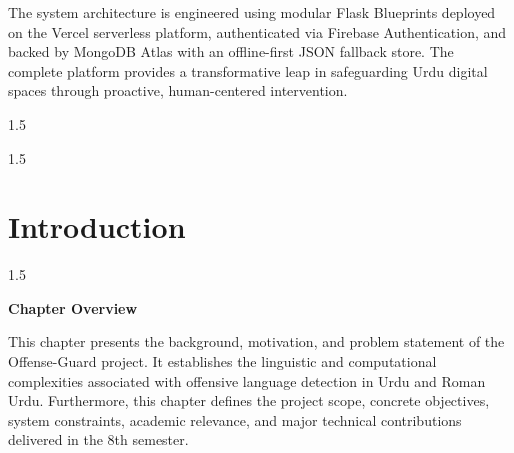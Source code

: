 \documentclass[A4paper,12pt]{report}
\theoremstyle{plain}
\theoremstyle{definition}
\renewcommand*\listfigurename{\par\hbox{LIST OF FIGURES \strut}\hrule height .05cm}
\renewcommand*\listtablename{\par\hbox{LIST OF TABLES \strut}\hrule height .05cm}
\theoremstyle{remark}
\numberwithin{equation}{section}
\begin{document}
{The system architecture is engineered using modular Flask Blueprints deployed on the Vercel serverless platform, authenticated via Firebase Authentication, and backed by MongoDB Atlas with an offline-first JSON fallback store. The complete platform provides a transformative leap in safeguarding Urdu digital spaces through proactive, human-centered intervention.}

\begin{spacing}{1.5}
\newpage
\renewcommand{\cftaftertoctitle}{\hfill}
\renewcommand*\cftaftertoctitle{{\strut \hfill}\hrule height .05cm}
\tableofcontents

\newpage
\centering \renewcommand*\listfigurename{LIST OF FIGURES}
\renewcommand{\cftafterloftitle}{\hfill}
\renewcommand*\cftafterloftitle{{\strut \hfill}\hrule height .05cm}
\listoffigures

\clearpage
{\let\oldnumberline\numberline
\renewcommand{\numberline}{\tablename~\oldnumberline}
\centering \renewcommand*\listtablename{LIST OF TABLES}
\renewcommand{\cftafterlottitle}{\hfill}
\renewcommand*\cftafterlottitle{{\strut \hfill}\hrule height .05cm}
\listoftables}
\clearpage
\end{spacing}

\begin{spacing}{1.5}

\chapter{Introduction}
\thispagestyle{empty}
\newpage
\setlength{\parindent}{0pt}
\end{spacing}

\begin{spacing}{1.5}

\thispagestyle{empty}

{\centering \Large \bfseries Chapter Overview \par}
\vspace{1cm}

This chapter presents the background, motivation, and problem statement of the Offense-Guard project. It establishes the linguistic and computational complexities associated with offensive language detection in Urdu and Roman Urdu. Furthermore, this chapter defines the project scope, concrete objectives, system constraints, academic relevance, and major technical contributions delivered in the 8th semester.

\end{spacing}
\end{document}
